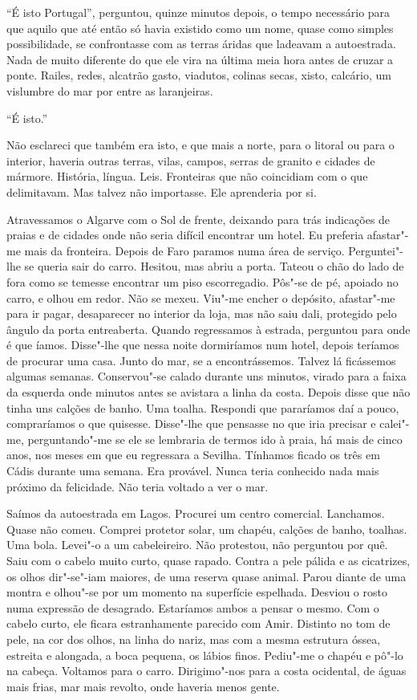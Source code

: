 ``É isto Portugal'',
perguntou, quinze minutos depois, o tempo necessário para que aquilo que
até então só havia existido como um nome, quase como simples
possibilidade, se confrontasse com as terras áridas que ladeavam a
autoestrada. Nada de muito diferente do que ele vira na última meia
hora antes de cruzar a ponte. Railes, redes, alcatrão gasto, viadutos,
colinas secas, xisto, calcário, um vislumbre do mar por entre as
laranjeiras.

``É isto.''

Não esclareci que também era isto, e que mais a norte, para o litoral ou
para o interior, haveria outras terras, vilas, campos, serras de granito
e cidades de mármore. História, língua. Leis. Fronteiras que não
coincidiam com o que delimitavam. Mas talvez não importasse. Ele
aprenderia por si.

Atravessamos o Algarve com o Sol de frente, deixando para trás
indicações de praias e de cidades onde não seria difícil encontrar um
hotel. Eu preferia afastar"-me mais da fronteira. Depois de Faro paramos
numa área de serviço. Perguntei"-lhe se queria sair do carro. Hesitou,
mas abriu a porta. Tateou o chão do lado de fora como se temesse
encontrar um piso escorregadio. Pôs"-se de pé, apoiado no carro, e olhou
em redor. Não se mexeu. Viu"-me encher o depósito, afastar"-me para ir
pagar, desaparecer no interior da loja, mas não saiu dali, protegido
pelo ângulo da porta entreaberta. Quando regressamos à estrada,
perguntou para onde é que íamos. Disse"-lhe que nessa noite dormiríamos
num hotel, depois teríamos de procurar uma casa. Junto do mar, se a
encontrássemos. Talvez lá ficássemos algumas semanas. Conservou"-se
calado durante uns minutos, virado para a faixa da esquerda onde minutos
antes se avistara a linha da costa. Depois disse que não tinha uns
calções de banho. Uma toalha. Respondi que pararíamos daí a pouco,
compraríamos o que quisesse. Disse"-lhe que pensasse no que iria
precisar e calei"-me, perguntando"-me se ele se lembraria de termos ido
à praia, há mais de cinco anos, nos meses em que eu regressara a
Sevilha. Tínhamos ficado os três em Cádis durante uma semana. Era
provável. Nunca teria conhecido nada mais próximo da felicidade. Não
teria voltado a ver o mar.

Saímos da autoestrada em Lagos. Procurei um centro comercial.
Lanchamos. Quase não comeu. Comprei protetor solar, um chapéu, calções
de banho, toalhas. Uma bola. Levei"-o a um cabeleireiro. Não protestou,
não perguntou por quê. Saiu com o cabelo muito curto, quase rapado.
Contra a pele pálida e as cicatrizes, os olhos dir"-se"-iam maiores, de
uma reserva quase animal. Parou diante de uma montra e olhou"-se por um
momento na superfície espelhada. Desviou o rosto numa expressão de
desagrado. Estaríamos ambos a pensar o mesmo. Com o cabelo curto, ele
ficara estranhamente parecido com Amir. Distinto no tom de pele, na cor
dos olhos, na linha do nariz, mas com a mesma estrutura óssea, estreita
e alongada, a boca pequena, os lábios finos. Pediu"-me o chapéu e pô"-lo
na cabeça. Voltamos para o carro. Dirigimo"-nos para a costa ocidental,
de águas mais frias, mar mais revolto, onde haveria menos gente.

